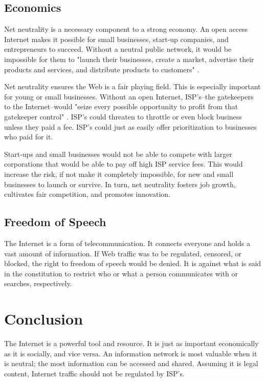 \documentclass[11pt]{article}
\begin{document}
\subsection{Economics}
Net neutrality is a necessary component to a strong economy.  An open access Internet makes it possible for small businesses, start-up companies, and entrepreneurs to succeed.  Without a neutral public network, it would be impossible for them to "launch their businesses, create a market, advertise their products and services, and distribute products to customers" \cite{FP}.  

Net neutrality ensures the Web is a fair playing field.  This is especially important for young or small businesses.  Without an open Internet, ISP's--the gatekeepers to the Internet--would "seize every possible opportunity to profit from that gatekeeper control" \cite{FP}.  ISP's could threaten to throttle or even block business unless they paid a fee.  ISP's could just as easily offer prioritization to businesses who paid for it.

Start-ups and small businesses would not be able to compete with larger corporations that would be able to pay off high ISP service fees.  This would increase the risk, if not make it completely impossible, for new and small businesses to launch or survive. In turn, net neutrality fosters job growth, cultivates fair competition, and promotes innovation.

\subsection{Freedom of Speech}
The Internet is a form of telecommunication.  It connects everyone and holds a vast amount of information.  If Web traffic was to be regulated, censored, or blocked, the right to freedom of speech would be denied.  It is against what is said in the constitution to restrict who or what a person communicates with or searches, respectively.

\section{Conclusion}
The Internet is a powerful tool and resource.  It is just as important economically as it is socially, and vice versa.  An information network is most valuable when it is neutral; the most information can be accessed and shared.  Assuming it is legal content, Internet traffic should not be regulated by ISP's.
\end{document}
